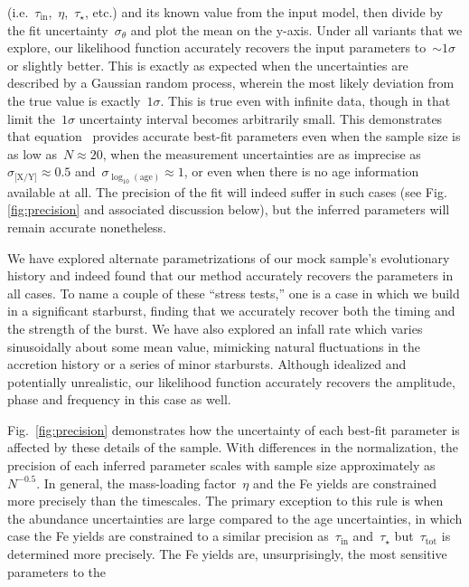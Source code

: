 \documentclass[ms.tex]{subfiles}
\begin{document}
(i.e.~$\tau_\text{in}$,~$\eta$,~$\tau_\star$, etc.) and its known value from
the input model, then divide by the fit uncertainty~$\sigma_\theta$ and plot
the mean on the y-axis.
Under all variants that we explore, our likelihood function accurately recovers
the input parameters to~$\sim1\sigma$ or slightly better.
This is exactly as expected when the uncertainties are described by a
Gaussian random process, wherein the most likely deviation from the true value
is exactly~$1\sigma$.
This is true even with infinite data, though in that limit the~$1\sigma$
uncertainty interval becomes arbitrarily small.
This demonstrates that equation~ provides accurate best-fit
parameters even when the sample size is as low as~$N \approx 20$, when the
measurement uncertainties are as imprecise as~$\sigma_\text{[X/Y]} \approx 0.5$
and~$\sigma_{\log_{10}(\text{age})} \approx 1$, or even when there is no age
information available at all.
The precision of the fit will indeed suffer in such cases (see Fig.
\ref{fig:precision} and associated discussion below), but the inferred
parameters will remain accurate nonetheless.
\par
We have explored alternate parametrizations of our mock sample's evolutionary
history and indeed found that our method accurately recovers the parameters
in all cases.
To name a couple of these ``stress tests,'' one is a case in which we build in
a significant starburst, finding that we accurately recover both the timing and
the strength of the burst.
We have also explored an infall rate which varies sinusoidally about some mean
value, mimicking natural fluctuations in the accretion history or a series of
minor starbursts.
Although idealized and potentially unrealistic, our likelihood function
accurately recovers the amplitude, phase and frequency in this case as well.
\par
Fig.~\ref{fig:precision} demonstrates how the uncertainty of each best-fit
parameter is affected by these details of the sample.
With differences in the normalization, the precision of each inferred parameter
scales with sample size approximately as~$N^{-0.5}$.
In general, the mass-loading factor~$\eta$ and the Fe yields are constrained
more precisely than the timescales.
The primary exception to this rule is when the abundance uncertainties are
large compared to the age uncertainties, in which case the Fe yields are
constrained to a similar precision as~$\tau_\text{in}$ and~$\tau_\star$
but~$\tau_\text{tot}$ is determined more precisely.
The Fe yields are, unsurprisingly, the most sensitive parameters to the
\end{document}
